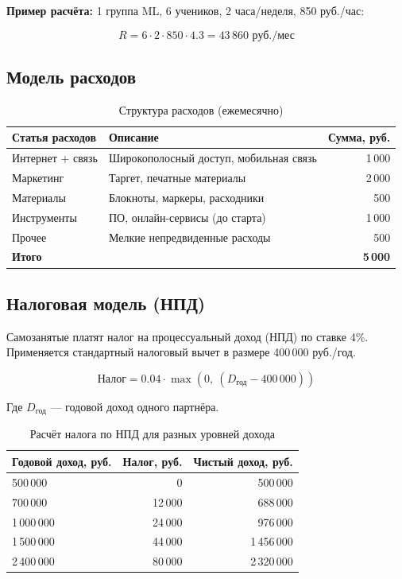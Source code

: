 \documentclass[12pt,a4paper]{article}
\begin{document}
\textbf{Пример расчёта:} 1 группа ML, 6 учеников, 2 часа/неделя, 850 руб./час:

\begin{equation}
R = 6 \cdot 2 \cdot 850 \cdot 4.3 = 43\,860 \text{ руб./мес}
\end{equation}

\subsection{Модель расходов}

\begin{table}[H]
\centering
\caption{Структура расходов (ежемесячно)}
\label{tab:expenses}
\begin{tabular}{llr}
\toprule
Статья расходов & Описание & Сумма, руб. \\
\midrule
Интернет + связь & Широкополосный доступ, мобильная связь & 1\,000 \\
Маркетинг & Таргет, печатные материалы & 2\,000 \\
Материалы & Блокноты, маркеры, расходники & 500 \\
Инструменты & ПО, онлайн-сервисы (до старта) & 1\,000 \\
Прочее & Мелкие непредвиденные расходы & 500 \\
\midrule
\textbf{Итого} & & \textbf{5\,000} \\
\bottomrule
\end{tabular}
\end{table}

\subsection{Налоговая модель (НПД)}

Самозанятые платят налог на процессуальный доход (НПД) по ставке 4\%. Применяется стандартный налоговый вычет в размере 400\,000 руб./год.

\begin{equation}
\text{Налог} = 0.04 \cdot \max(0,\ (D_{\text{год}} - 400\,000))
\label{eq:npd_tax}
\end{equation}

Где $D_{\text{год}}$ --- годовой доход одного партнёра.

\begin{table}[H]
\centering
\caption{Расчёт налога по НПД для разных уровней дохода}
\label{tab:npd_calculation}
\begin{tabular}{lrr}
\toprule
Годовой доход, руб. & Налог, руб. & Чистый доход, руб. \\
\midrule
500\,000 & 0 & 500\,000 \\
700\,000 & 12\,000 & 688\,000 \\
1\,000\,000 & 24\,000 & 976\,000 \\
1\,500\,000 & 44\,000 & 1\,456\,000 \\
2\,400\,000 & 80\,000 & 2\,320\,000 \\
\bottomrule
\end{tabular}
\end{table}
\end{document}
